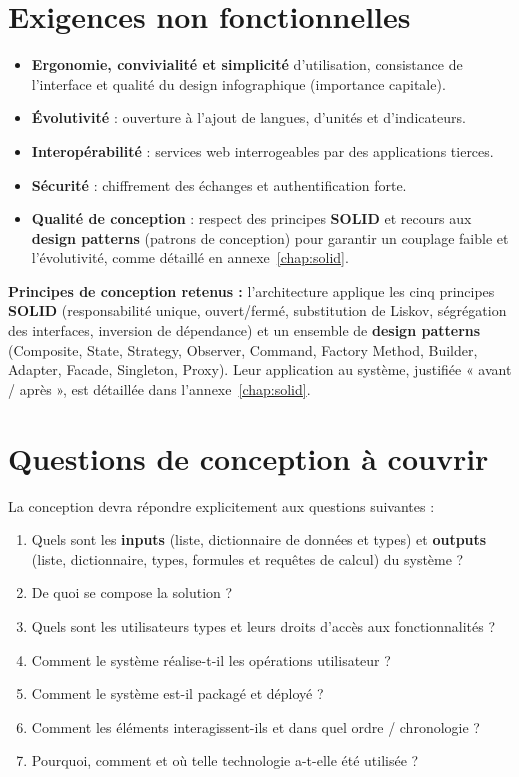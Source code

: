 \section{Exigences non fonctionnelles}
\begin{itemize}
  \item \textbf{Ergonomie, convivialité et simplicité} d'utilisation, consistance de l'interface et qualité du design infographique (importance capitale).
  \item \textbf{Évolutivité} : ouverture à l'ajout de langues, d'unités et d'indicateurs.
  \item \textbf{Interopérabilité} : services web interrogeables par des applications tierces.
  \item \textbf{Sécurité} : chiffrement des échanges et authentification forte.
  \item \textbf{Qualité de conception} : respect des principes \textbf{SOLID} et recours aux \textbf{design patterns} (patrons de conception) pour garantir un couplage faible et l'évolutivité, comme détaillé en annexe~\ref{chap:solid}.
\end{itemize}

\begin{encadre}
\textbf{Principes de conception retenus :} l'architecture applique les cinq
principes \textbf{SOLID} (responsabilité unique, ouvert/fermé, substitution de
Liskov, ségrégation des interfaces, inversion de dépendance) et un ensemble de
\textbf{design patterns} (Composite, State, Strategy, Observer, Command, Factory
Method, Builder, Adapter, Facade, Singleton, Proxy). Leur application au
système, justifiée « avant / après », est détaillée dans
l'annexe~\ref{chap:solid}.
\end{encadre}

\section{Questions de conception à couvrir}
La conception devra répondre explicitement aux questions suivantes :
\begin{enumerate}
  \item Quels sont les \textbf{inputs} (liste, dictionnaire de données et types) et \textbf{outputs} (liste, dictionnaire, types, formules et requêtes de calcul) du système ?
  \item De quoi se compose la solution ?
  \item Quels sont les utilisateurs types et leurs droits d'accès aux fonctionnalités ?
  \item Comment le système réalise-t-il les opérations utilisateur ?
  \item Comment le système est-il packagé et déployé ?
  \item Comment les éléments interagissent-ils et dans quel ordre / chronologie ?
  \item Pourquoi, comment et où telle technologie a-t-elle été utilisée ?
\end{enumerate}

